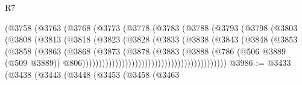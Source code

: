 \begin{lexlean}{R7}
\begin{coremodule}
                                    (@3758
                                      (@3763
                                        (@3768
                                          (@3773
                                            (@3778
                                              (@3783
                                                (@3788
                                                  (@3793
                                                    (@3798
                                                      (@3803
                                                        (@3808
                                                          (@3813
                                                            (@3818
                                                              (@3823
                                                                (@3828
                                                                  (@3833
                                                                    (@3838
                                                                      (@3843
                                                                        (@3848
                                                                          (@3853
                                                                            (@3858
                                                                              (@3863
                                                                                (@3868
                                                                                  (@3873
                                                                                    (@3878
                                                                                      (@3883
                                                                                        (@3888
                                                                                          (@786
                                                                                            (@506
                                                                                              @3889
                                                                                              (@509
                                                                                                @3889))
                                                                                            @806))))))))))))))))))))))))))))))))))))))))))))
@3986 := @3433
    (@3438
      (@3443
        (@3448
          (@3453
            (@3458
              (@3463

\end{coremodule}
\end{lexlean}
